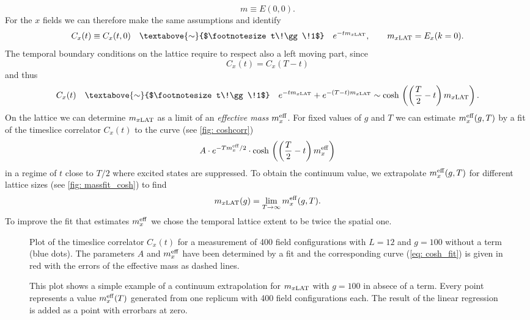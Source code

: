 %
%
\begin{equation}
m \equiv E(0,0).
\end{equation}
%
%
For the $x$ fields we can therefore make the same assumptions and identify
%
%
\begin{equation}
C_{x}(t) \equiv C_{x}(t,0) \quad \textabove{\sim}{$\footnotesize t\!\gg\!1$} \quad e^{-tm_{x \rm LAT}}, \qquad m_{x\rm LAT} = E_{x}(k=0).
\end{equation}
%
%
The temporal boundary conditions on the lattice require to respect also a left moving part, since
%
%
\begin{equation}
C_{x}(t) = C_{x}(T-t)
\end{equation}
%
%
and thus
%
%
\begin{equation}
C_{x}(t) \quad \textabove{\sim}{$\footnotesize t\!\gg\!1$} \quad e^{-tm_{x \rm LAT}}+e^{-(T-t)m_{x \rm LAT}} \sim \text{cosh\,}\left(\left(\frac{T}{2}-t\right) m_{x\rm LAT}\right).
\end{equation}
%
%
%
%
On the lattice we can determine $m_{x\rm LAT}$ as a limit of an \textit{effective mass} $m_{x}^{\rm eff}$. For fixed values of $g$ and $T$ we can estimate $m_{x}^{\rm eff}(g,T)$ by a fit of the timeslice correlator $C_{x}(t)$ to the curve (see \autoref{fig: coshcorr})
%
%
\begin{equation}
A\cdot e^{-Tm_{x}^{\rm eff}/2}\cdot\text{cosh\,}\left(\left(\frac{T}{2}-t\right) m_{x}^{\rm eff}\right)
\label{eq: cosh_fit}
\end{equation}
%
%
in a regime of $t$ close to $T/2$ where excited states are suppressed. To obtain the continuum value, we extrapolate $m_{x}^{\rm eff}(g,T)$ for different lattice sizes (see \autoref{fig: massfit_cosh}) to find
%
%
\begin{equation}
m_{x\rm LAT}(g) = \lim\limits_{T\to \infty} m_{x}^{\rm eff}(g,T).
\end{equation}
To improve the fit that estimates $m_{x}^{\rm eff}$ we chose the temporal lattice extent to be twice the spatial one.
%
%
%
\begin{figure}
\centering

\caption{Plot of the timeslice correlator $C_{x}(t)$ for a measurement of 400 field configurations with $L=12$ and $g=100$ without a  term (blue dots). The parameters $A$ and $m_{x}^{\rm eff}$ have been determined by a fit and the corresponding curve (\ref{eq: cosh_fit}) is given in red with the errors of the effective mass as dashed lines.\label{fig: coshcorr}}
\end{figure}
%
%
\begin{figure}
\centering

\caption{This plot shows a simple example of a continuum extrapolation for $m_{x\rm LAT}$ with $g=100$ in absece of a  term. Every point represents a value $m_{x}^{\rm eff}(T)$ generated from one replicum with 400 field configurations each. The result of the linear regression is added as a point with errorbars at zero. \label{fig: massfit_cosh}}
\end{figure}
%
%
%
%
%
%
%
%
%
